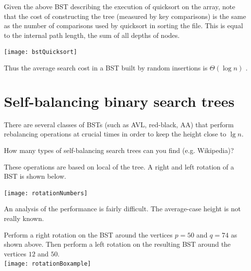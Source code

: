 Given the above BST describing the execution of quicksort on the array, 
note that the cost of constructing the tree (measured by key comparisons) is 
the same as the number of comparisons used by quicksort in sorting the file.
This is equal to the internal path length, the sum of all depths of nodes.

\begin{center}
  \texttt{[image: bstQuicksort]}
\end{center}

Thus the average search cost in a BST built by random insertions is $\Theta(\log n)$ .


\chapter{Self-balancing binary search trees} %
\label{sec:balanced}
There are several classes of BSTs (such as AVL, red-black, AA) that 
perform rebalancing operations at crucial times in order to keep the height 
close to $\lg n$.

\begin{Boxample}[2]
How many types of self-balancing search trees can you find (e.g. Wikipedia)?
\end{Boxample}

These operations are based on local  of the tree. 
A right and left rotation of a BST is shown below.

\begin{center}
  \texttt{[image: rotationNumbers]}
\end{center}

An analysis of the performance is fairly difficult.
The average-case height is not really known.

\begin{Boxample}[7]
Perform a right rotation on the BST around the vertices $p = 50$ and $q = 74$ as shown above.
Then perform a left rotation on the resulting BST around the vertices $12$ and $50$.\\
\newline 
\texttt{[image: rotationBoxample]}
\end{Boxample}


